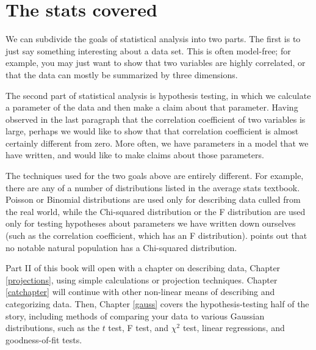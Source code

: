 



\section{The stats covered} 
We can subdivide the goals of statistical analysis into two parts. The
first is to just say something interesting about a data set. This is often
model-free; for example, you may just want to show that two variables
are highly correlated, or that the data can mostly be summarized by three
dimensions.

The second part of statistical analysis is hypothesis testing, in which
we calculate a parameter of the data and then make a claim about that
parameter.  Having observed in the last paragraph that the correlation
coefficient of two variables is large, perhaps we would like to show
that that correlation coefficient is almost certainly different from
zero. More often, we have parameters in a model that we have written,
and would like to make claims about those parameters.

The techniques used for the two goals above are entirely different. For
example, there are any of a number of distributions listed in the
average stats textbook.  Poisson or Binomial distributions are used
only for describing data culled from the real world, while the Chi-squared
distribution or the F distribution are used only for testing hypotheses
about parameters we have written down ourselves (such as the correlation
coefficient, which has an F distribution). \citet[p 141]{kmenta} points out
that no notable natural population has a Chi-squared distribution.

Part II of this book will open with a chapter on describing data,
Chapter \ref{projections}, using simple calculations or projection
techniques. Chapter \ref{catchapter} will continue with other non-linear
means of describing and categorizing data. Then, Chapter \ref{gauss}
covers the hypothesis-testing half of the story, including methods of
comparing your data to various Gaussian distributions, such as the $t$
test, F test, and $\chi^2$ test, linear regressions, and goodness-of-fit
tests.



